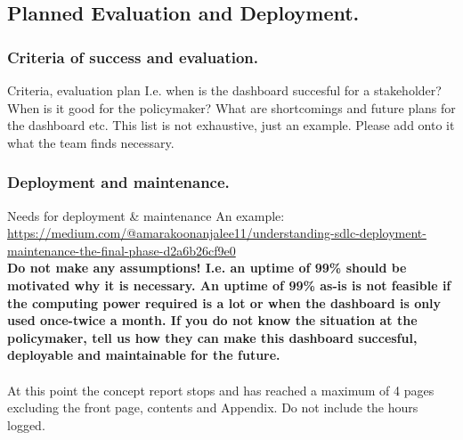 \subsection{Planned Evaluation and Deployment.}

\subsubsection{Criteria of success and evaluation.}
Criteria, evaluation plan
I.e. when is the dashboard succesful for a stakeholder? When is it good for the policymaker? What are shortcomings and future plans for the dashboard etc. This list is not exhaustive, just an example. Please add onto it what the team finds necessary. 

\subsubsection{Deployment and maintenance.}
Needs for deployment \& maintenance 
An example: \url{https://medium.com/@amarakoonanjalee11/understanding-sdlc-deployment-maintenance-the-final-phase-d2a6b26cf9e0} 
\\
\textbf{Do not make any assumptions! I.e. an uptime of 99\% should be motivated why it is necessary. An uptime of 99\% as-is is not feasible if the computing power required is a lot or when the dashboard is only used once-twice a month. If you do not know the situation at the policymaker, tell us how they can make this dashboard succesful, deployable and maintainable for the future.} \\ \\
At this point the concept report stops and has reached a maximum of 4 pages excluding the front page, contents and  Appendix. Do not include the hours logged.

